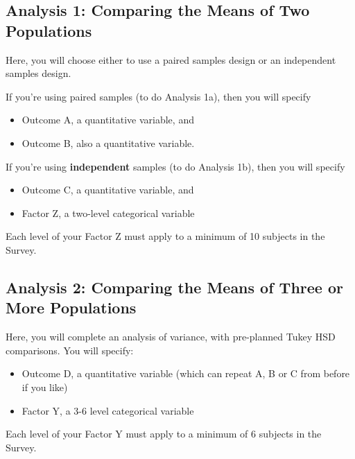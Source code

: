 \documentclass[]{book}
\providecommand{\tightlist}{%
  \setlength{\itemsep}{0pt}\setlength{\parskip}{0pt}}
\begin{document}
\hypertarget{analysis-1-comparing-the-means-of-two-populations}{%
\subsection{Analysis 1: Comparing the Means of Two Populations}\label{analysis-1-comparing-the-means-of-two-populations}}

Here, you will choose either to use a paired samples design or an independent samples design.

If you're using paired samples (to do Analysis 1a), then you will specify

\begin{itemize}
\tightlist
\item
  Outcome A, a quantitative variable, and
\item
  Outcome B, also a quantitative variable.
\end{itemize}

If you're using \textbf{independent} samples (to do Analysis 1b), then you will specify

\begin{itemize}
\tightlist
\item
  Outcome C, a quantitative variable, and
\item
  Factor Z, a two-level categorical variable
\end{itemize}

Each level of your Factor Z must apply to a minimum of 10 subjects in the Survey.

\hypertarget{analysis-2-comparing-the-means-of-three-or-more-populations}{%
\subsection{Analysis 2: Comparing the Means of Three or More Populations}\label{analysis-2-comparing-the-means-of-three-or-more-populations}}

Here, you will complete an analysis of variance, with pre-planned Tukey HSD comparisons. You will specify:

\begin{itemize}
\tightlist
\item
  Outcome D, a quantitative variable (which can repeat A, B or C from before if you like)
\item
  Factor Y, a 3-6 level categorical variable
\end{itemize}

Each level of your Factor Y must apply to a minimum of 6 subjects in the Survey.
\end{document}
